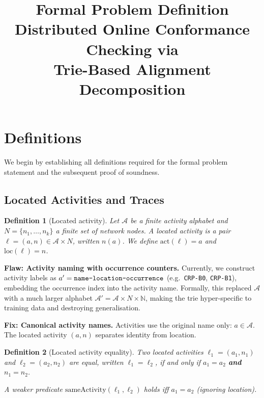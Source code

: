 \documentclass[11pt,a4paper]{article}
\title{Formal Problem Definition\\[4pt]
\large Distributed Online Conformance Checking via\\
Trie-Based Alignment Decomposition}
\author{}
\date{}
\newtheorem{definition}{Definition}
\newcommand{\A}{\mathcal{A}}
\newcommand{\loc}{\mathrm{loc}}
\newcommand{\act}{\mathrm{act}}
\newcommand{\Nodes}{N}
\newcommand{\na}[2]{#1(#2)}
\begin{document}
\maketitle

\section{Definitions}
\label{sec:definitions}

We begin by establishing all definitions required for the formal problem
statement and the subsequent proof of soundness.

\subsection{Located Activities and Traces}

\begin{definition}[Located activity]\label{def:located-activity}
  Let $\A$ be a finite activity alphabet and
  $\Nodes = \{n_1, \dots, n_k\}$ a finite set of network nodes.
  A \emph{located activity} is a pair
  $\ell = (a, n) \in \A \times \Nodes$, written $\na{n}{a}$.
  We define $\act(\ell) = a$ and $\loc(\ell) = n$.
\end{definition}

\begin{oldbox}
\textbf{Flaw: Activity naming with occurrence counters.}\;
Currently, we construct activity labels as
$a' = \texttt{name\text{-}location\text{-}occurrence}$
(e.g.\ \texttt{CRP-B0}, \texttt{CRP-B1}), embedding the occurrence
index into the activity name.
Formally, this replaced $\A$ with a much larger alphabet
$\A' = \A \times \Nodes \times \mathbb{N}$, making the trie
hyper-specific to training data and destroying generalisation.
\end{oldbox}

\begin{newboxelem}
\textbf{Fix: Canonical activity names.}\;
Activities use the original name only: $a \in \A$.
The located activity $(a, n)$ separates identity from location.
\end{newboxelem}

\medskip

\begin{definition}[Located activity equality]\label{def:la-equality}
  Two located activities $\ell_1 = (a_1, n_1)$ and $\ell_2 = (a_2, n_2)$
  are \emph{equal}, written $\ell_1 = \ell_2$, if and only if
  $a_1 = a_2$ \textbf{and} $n_1 = n_2$.

  A weaker predicate $\mathrm{sameActivity}(\ell_1, \ell_2)$ holds iff
  $a_1 = a_2$ (ignoring location).
\end{definition}
\end{document}
